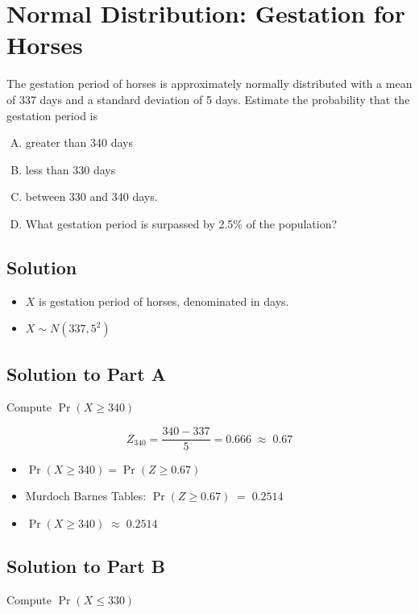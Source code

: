 
\section*{Normal Distribution: Gestation for Horses}
\noindent The gestation period of horses is approximately normally distributed with a mean of 337 days and a standard deviation of 5 days. 
Estimate the probability that the gestation period is


\begin{enumerate}[(A)]
	\item       greater than 340 days
	
\item  less than 330 days
	
\item  between 330 and 340 days. 
	
\item  What gestation period is surpassed by 2.5\% of the population?
\end{enumerate}


\subsection*{Solution}
\begin{itemize}
\item $X$ is gestation period of horses, denominated in days.
\item $X \sim N(337,5^2)$
\end{itemize}

\subsection*{Solution to Part A}
Compute $\Pr(X\geq 340)$

\[Z_{340} = \frac{340-337}{5} = 0.666 \;\approx\; 0.67\]

\begin{itemize}
    \item $\Pr(X\geq 340) = \Pr(Z \geq 0.67)$
    \item Murdoch Barnes Tables: $\Pr(Z \geq 0.67) \;=\;  0.2514$
    \item $\Pr(X\geq 340) \; \approx \;  0.2514$
\end{itemize}

\subsection*{Solution to Part B}
Compute $\Pr(X\leq 330)$    

